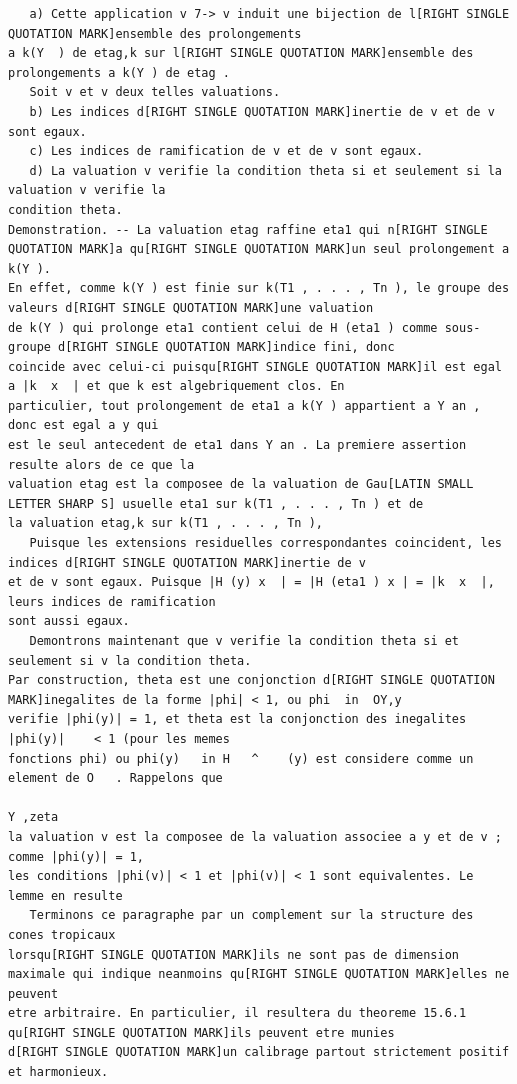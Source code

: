 \documentclass[
  11pt,
]{article}
\begin{document}
\begin{lstlisting}
   a) Cette application v 7-> v induit une bijection de l[RIGHT SINGLE QUOTATION MARK]ensemble des prolongements
a k(Y  ) de etag,k sur l[RIGHT SINGLE QUOTATION MARK]ensemble des prolongements a k(Y ) de etag .
   Soit v et v deux telles valuations.
   b) Les indices d[RIGHT SINGLE QUOTATION MARK]inertie de v et de v sont egaux.
   c) Les indices de ramification de v et de v sont egaux.
   d) La valuation v verifie la condition theta si et seulement si la valuation v verifie la
condition theta.
Demonstration. -- La valuation etag raffine eta1 qui n[RIGHT SINGLE QUOTATION MARK]a qu[RIGHT SINGLE QUOTATION MARK]un seul prolongement a k(Y ).
En effet, comme k(Y ) est finie sur k(T1 , . . . , Tn ), le groupe des valeurs d[RIGHT SINGLE QUOTATION MARK]une valuation
de k(Y ) qui prolonge eta1 contient celui de H (eta1 ) comme sous-groupe d[RIGHT SINGLE QUOTATION MARK]indice fini, donc
coincide avec celui-ci puisqu[RIGHT SINGLE QUOTATION MARK]il est egal a |k  x  | et que k est algebriquement clos. En
particulier, tout prolongement de eta1 a k(Y ) appartient a Y an , donc est egal a y qui
est le seul antecedent de eta1 dans Y an . La premiere assertion resulte alors de ce que la
valuation etag est la composee de la valuation de Gau[LATIN SMALL LETTER SHARP S] usuelle eta1 sur k(T1 , . . . , Tn ) et de
la valuation etag,k sur k(T1 , . . . , Tn ),
   Puisque les extensions residuelles correspondantes coincident, les indices d[RIGHT SINGLE QUOTATION MARK]inertie de v
et de v sont egaux. Puisque |H (y) x  | = |H (eta1 ) x | = |k  x  |, leurs indices de ramification
sont aussi egaux.
   Demontrons maintenant que v verifie la condition theta si et seulement si v la condition theta.
Par construction, theta est une conjonction d[RIGHT SINGLE QUOTATION MARK]inegalites de la forme |phi| < 1, ou phi  in  OY,y
verifie |phi(y)| = 1, et theta est la conjonction des inegalites |phi(y)|    < 1 (pour les memes
fonctions phi) ou phi(y)   in H   ^    (y) est considere comme un element de O   . Rappelons que
                                                                         Y ,zeta
la valuation v est la composee de la valuation associee a y et de v ; comme |phi(y)| = 1,
les conditions |phi(v)| < 1 et |phi(v)| < 1 sont equivalentes. Le lemme en resulte
   Terminons ce paragraphe par un complement sur la structure des cones tropicaux
lorsqu[RIGHT SINGLE QUOTATION MARK]ils ne sont pas de dimension maximale qui indique neanmoins qu[RIGHT SINGLE QUOTATION MARK]elles ne peuvent
etre arbitraire. En particulier, il resultera du theoreme 15.6.1 qu[RIGHT SINGLE QUOTATION MARK]ils peuvent etre munies
d[RIGHT SINGLE QUOTATION MARK]un calibrage partout strictement positif et harmonieux.




\end{lstlisting}
\end{document}
